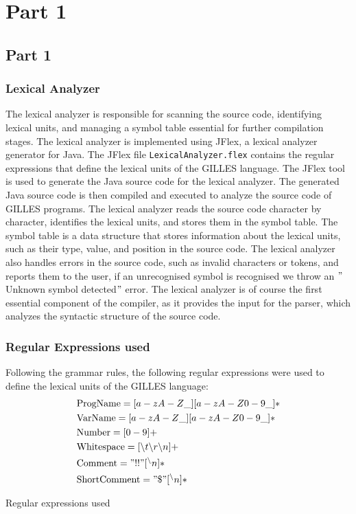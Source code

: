 \setcounter{secnumdepth}{3}

\chapter{Part 1}

    \section{Part 1}
    \subsection{Lexical Analyzer}
	The lexical analyzer is responsible for scanning the source code, identifying lexical units,
	and managing a symbol table essential for further compilation stages.
	The lexical analyzer is implemented using JFlex, a lexical analyzer generator for Java.
	The JFlex file \texttt{LexicalAnalyzer.flex} contains the regular expressions that define the lexical units of the GILLES language.
	The JFlex tool is used to generate the Java source code for the lexical analyzer.
	The generated Java source code is then compiled and executed to analyze the source code of GILLES programs.
	The lexical analyzer reads the source code character by character, identifies the lexical units, and stores them in the symbol table.
	The symbol table is a data structure that stores information about the lexical units, such as their type, value, and position in the source code.
	The lexical analyzer also handles errors in the source code, such as invalid characters or tokens, and reports them to the user, if an unrecognised symbol is recognised we throw an \("\)Unknown symbol detected\("\) error.
	The lexical analyzer is of course the first essential component of the compiler, as it provides the input for the parser, which analyzes the syntactic structure of the source code.\\

	\subsection{Regular Expressions used}
	Following the grammar rules, the following regular expressions were used to define the lexical units of the GILLES language:
	\begin{align*}
		&\text{ProgName}     = [a-zA-Z\_][a-zA-Z0-9\_]* \\
		&\text{VarName}      = [a-zA-Z\_][a-zA-Z0-9\_]* \\
		&\text{Number}       = [0-9]+ \\
		&\text{Whitespace}   = [ \text{\textbackslash} t\text{\textbackslash} r\text{\textbackslash} n]+ \\
		&\text{Comment}      = "!!"[^\text{\textbackslash} n]* \\
		&\text{ShortComment} = "\$"[^\text{\textbackslash} n]*
	\end{align*}
    \begin{table}[h]
		\centering
		\caption{Regular expressions used}
	\end{table}

